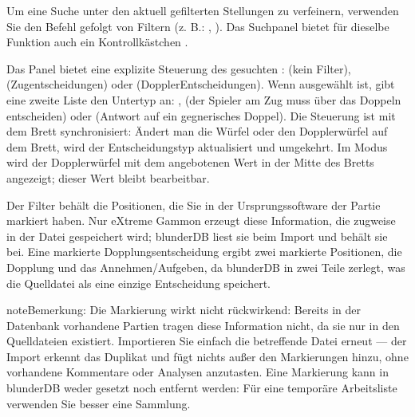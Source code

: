 \documentclass[letterpaper,10pt,german]{sphinxmanual}
\begin{document}
\sphinxAtStartPar
Um eine Suche unter den aktuell gefilterten Stellungen zu verfeinern, verwenden Sie den Befehl  gefolgt von Filtern (z. B.: , ). Das Suchpanel bietet für dieselbe Funktion auch ein Kontrollkästchen .

\sphinxAtStartPar
Das Panel bietet eine explizite Steuerung des gesuchten :  (kein Filter),  (Zugentscheidungen) oder  (Doppler\sphinxhyphen{}Entscheidungen). Wenn  ausgewählt ist, gibt eine zweite Liste den Untertyp an: ,  (der Spieler am Zug muss über das Doppeln entscheiden) oder  (Antwort auf ein gegnerisches Doppel). Die Steuerung ist mit dem Brett synchronisiert: Ändert man die Würfel oder den Dopplerwürfel auf dem Brett, wird der Entscheidungstyp aktualisiert und umgekehrt. Im Modus  wird der Dopplerwürfel mit dem angebotenen Wert in der Mitte des Bretts angezeigt; dieser Wert bleibt bearbeitbar.

\sphinxAtStartPar
Der Filter  behält die Positionen, die Sie in der Ursprungssoftware der Partie markiert haben. Nur eXtreme Gammon erzeugt diese Information, die zugweise in der \sphinxhyphen{}Datei gespeichert wird; blunderDB liest sie beim Import und behält sie bei. Eine markierte Dopplungsentscheidung ergibt zwei markierte Positionen, die Dopplung und das Annehmen/Aufgeben, da blunderDB in zwei Teile zerlegt, was die Quelldatei als eine einzige Entscheidung speichert.

\begin{sphinxadmonition}{note}{Bemerkung:}
\sphinxAtStartPar
Die Markierung wirkt nicht rückwirkend: Bereits in der Datenbank vorhandene Partien tragen diese Information nicht, da sie nur in den Quelldateien existiert. Importieren Sie einfach die betreffende \sphinxhyphen{}Datei erneut — der Import erkennt das Duplikat und fügt nichts außer den Markierungen hinzu, ohne vorhandene Kommentare oder Analysen anzutasten. Eine Markierung kann in blunderDB weder gesetzt noch entfernt werden: Für eine temporäre Arbeitsliste verwenden Sie besser eine Sammlung.
\end{sphinxadmonition}
\end{document}
